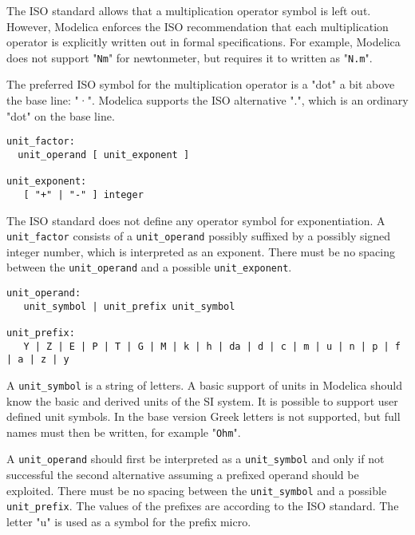The ISO standard allows that a multiplication operator symbol is left
out. However, Modelica enforces the ISO recommendation that each
multiplication operator is explicitly written out in formal
specifications. For example, Modelica does not support "\lstinline[basicstyle=\ttfamily]!Nm!" for
newtonmeter, but requires it to written as "\lstinline[basicstyle=\ttfamily]!N.m!".

The preferred ISO symbol for the multiplication operator is a "dot" a
bit above the base line: "·". Modelica supports the ISO alternative ".",
which is an ordinary "dot" on the base line.

\begin{lstlisting}[language=grammar]
unit_factor:
  unit_operand [ unit_exponent ]

unit_exponent:
   [ "+" | "-" ] integer
\end{lstlisting}

The ISO standard does not define any operator symbol for exponentiation.
A \lstinline[basicstyle=\ttfamily]!unit_factor! consists of a \lstinline[basicstyle=\ttfamily]!unit_operand! possibly suffixed by a
possibly signed integer number, which is interpreted as an exponent.
There must be no spacing between the \lstinline[basicstyle=\ttfamily]!unit_operand! and a possible
\lstinline[basicstyle=\ttfamily]!unit_exponent!.

\begin{lstlisting}[language=grammar]
unit_operand:
   unit_symbol | unit_prefix unit_symbol

unit_prefix:
   Y | Z | E | P | T | G | M | k | h | da | d | c | m | u | n | p | f | a | z | y
\end{lstlisting}

A \lstinline[basicstyle=\ttfamily]!unit_symbol! is a string of letters. A basic support of units in
Modelica should know the basic and derived units of the SI system. It is
possible to support user defined unit symbols. In the base version Greek
letters is not supported, but full names must then be written, for
example "\lstinline[basicstyle=\ttfamily]!Ohm!".

A \lstinline[basicstyle=\ttfamily]!unit_operand! should first be interpreted as a \lstinline[basicstyle=\ttfamily]!unit_symbol! and only
if not successful the second alternative assuming a prefixed operand
should be exploited. There must be no spacing between the \lstinline[basicstyle=\ttfamily]!unit_symbol!
and a possible \lstinline[basicstyle=\ttfamily]!unit_prefix!. The values of the prefixes are according to
the ISO standard. The letter "u" is used as a symbol for the prefix
micro.


